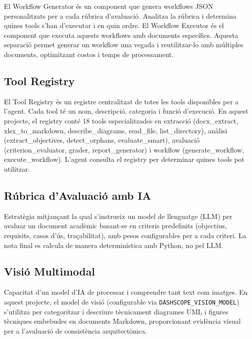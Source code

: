 \documentclass[12pt,a4paper,twoside]{report}
\begin{document}
El Workflow Generator \'es un component que genera workflows JSON personalitzats per a cada r\'ubrica d'avaluaci\'o. Analitza la r\'ubrica i determina quines tools s'han d'executar i en quin ordre. El Workflow Executor \'es el component que executa aquests workflows amb documents espec\'ifics. Aquesta separaci\'o permet generar un workflow una vegada i reutilitzar-lo amb m\'ultiples documents, optimitzant costos i temps de processament.

\subsection{Tool Registry}
\label{subsec:tool-registry}

El Tool Registry \'es un registre centralitzat de totes les tools disponibles per a l'agent. Cada tool t\'e un nom, descripci\'o, categoria i funci\'o d'execuci\'o. En aquest projecte, el registry cont\'e 18 tools especialitzades en extracci\'o (docx\_extract, xlsx\_to\_markdown, describe\_diagrams, read\_file, list\_directory), an\`alisi (extract\_objectives, detect\_orphans, evaluate\_smart), avaluaci\'o (criterion\_evaluator, grader, report\_generator) i workflow (generate\_workflow, execute\_workflow). L'agent consulta el registry per determinar quines tools pot utilitzar.

\subsection{R\'ubrica d'Avaluaci\'o amb IA}
\label{subsec:rubrica-ia}

Estrat\`egia mitjan\c{c}ant la qual s'instrueix un model de llenguatge (LLM) per avaluar un document acad\`emic basant-se en criteris predefinits (objectius, requisits, casos d'\'us, tra\c{c}abilitat), amb pesos configurables per a cada criteri. La nota final es calcula de manera determin\'istica amb Python, no pel LLM.

\subsection{Visi\'o Multimodal}
\label{subsec:visio-multimodal}

Capacitat d'un model d'IA de processar i comprendre tant text com imatges. En aquest projecte, el model de visi\'o (configurable via \texttt{DASHSCOPE\_VISION\_MODEL}) s'utilitza per categoritzar i descriure t\`ecnicament diagrames UML i figures t\`ecniques embebudes en documents Markdown, proporcionant evid\`encia visual per a l'avaluaci\'o de consist\`encia arquitect\`onica.
\end{document}
